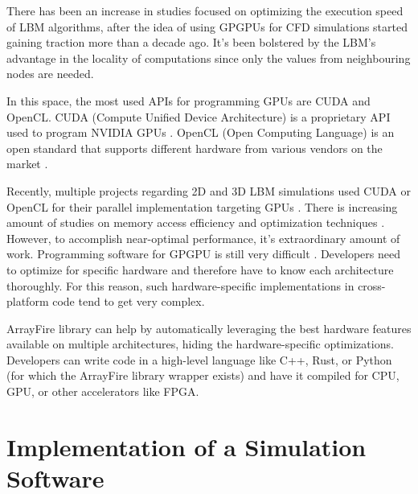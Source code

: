 There has been an increase in studies focused on optimizing the execution speed of LBM algorithms, after the idea of using GPGPUs for CFD simulations started gaining traction more than a decade ago. It's been bolstered by the LBM's advantage in the locality of computations since only the values from neighbouring nodes are needed. 

In this space, the most used APIs for programming GPUs are CUDA and OpenCL. CUDA (Compute Unified Device Architecture) is a proprietary API used to program NVIDIA GPUs \cite{stortiCUDAEngineersIntroduction2016}. OpenCL (Open Computing Language) is an open standard that supports different hardware from various vendors on the market \cite{karimiPerformanceComparisonCUDA}.

Recently, multiple projects regarding 2D and 3D LBM simulations used CUDA or OpenCL for their parallel implementation targeting GPUs \cite{delboscRealTimeSimulationIndoor, delboscOptimizedImplementationLattice2014,  januszewskiSailfishFlexibleMultiGPU2014, FULLGPUImplementation2017, kotsalosDigitalBloodMassively2019, kolihaOnlineVisualizationInteractive2015, szokePerformanceEvaluationTwoDimensional2017, harwoodLUMAManycoreFluid2018, harwoodParallelisationInteractiveLatticeBoltzmann2017}. There is increasing amount of studies on memory access efficiency and optimization techniques \cite{herschlagGPUDataAccess2018, tranPerformanceOptimization3D2017}. However, to accomplish near-optimal performance, it's extraordinary amount of work. Programming software for GPGPU is still very difficult \cite{amalcolmArrayFireGPUAcceleration2012a}. Developers need to optimize for specific hardware and therefore have to know each architecture thoroughly. For this reason, such hardware-specific implementations in cross-platform code tend to get very complex.

ArrayFire library can help by automatically leveraging the best hardware features available on multiple architectures, hiding the hardware-specific optimizations. Developers can write code in a high-level language like C++, Rust, or Python (for which the ArrayFire library wrapper exists) and have it compiled for CPU, GPU, or other accelerators like FPGA.


\section{Implementation of a Simulation Software} 

